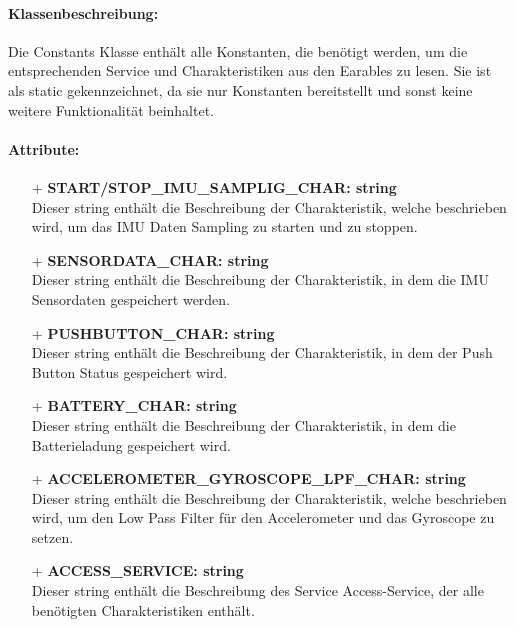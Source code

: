 \documentclass[a4paper,12pt]{article}
\begin{document}
\paragraph{Klassenbeschreibung:}
Die Constants Klasse enthält alle Konstanten, die benötigt werden, um die entsprechenden Service und Charakteristiken aus den \Gls{Earables} zu lesen. Sie ist als static gekennzeichnet, da sie nur Konstanten bereitstellt und sonst keine weitere Funktionalität beinhaltet.

\paragraph{Attribute:}
\begin{itemize}
	\item[+] \textbf{START/STOP\_IMU\_SAMPLIG\_CHAR: string}\\ Dieser string enthält die Beschreibung der Charakteristik, welche beschrieben wird,  um das IMU Daten Sampling zu starten und zu stoppen.
	\item[+] \textbf{SENSORDATA\_CHAR: string}\\ Dieser string enthält die Beschreibung der Charakteristik, in dem die IMU Sensordaten gespeichert werden.
	\item[+] \textbf{PUSHBUTTON\_CHAR: string} \\Dieser string enthält die Beschreibung der Charakteristik, in dem der Push Button Status gespeichert wird.
	\item[+] \textbf{BATTERY\_CHAR: string}\\ Dieser string enthält die Beschreibung der Charakteristik, in dem die Batterieladung gespeichert wird.
	\item[+] \textbf{ACCELEROMETER\_GYROSCOPE\_LPF\_CHAR: string}\\ Dieser string enthält die Beschreibung der Charakteristik, welche beschrieben wird, um den Low Pass Filter für den Accelerometer und das Gyroscope zu setzen.
\item[+] \textbf{ACCESS\_SERVICE: string}\\ Dieser string enthält die Beschreibung des Service Access-Service, der alle benötigten Charakteristiken enthält.\\
\end{itemize}
\end{document}
